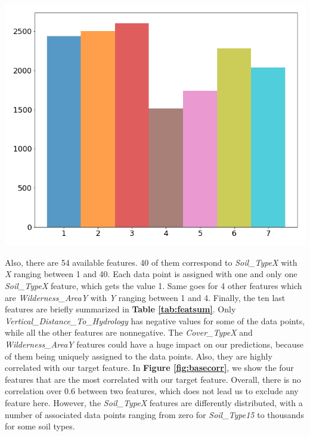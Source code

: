 \documentclass{article}
\newenvironment{Figure}
  {\par\medskip\noindent\minipage{\linewidth}}
  {\endminipage\par\medskip}
\begin{document}
\begin{multicols}{2}
\begin{Figure}
    \centering
    \captionsetup{type=figure}
    \includegraphics[width=0.75\linewidth]{figures/label_repart.png}
    \label{fig:labelrepart}
\end{Figure}

Also, there are 54
available features. 40 of them correspond to \textit{Soil\_TypeX} with \textit{X} ranging
between 1 and 40. Each data point is assigned with one and only one \textit{Soil\_TypeX}
feature, which gets the value 1. Same goes for 4 other features which are
\textit{Wilderness\_AreaY} with \textit{Y} ranging between 1 and 4. Finally, the ten last
features are briefly summarized in \textbf{Table \ref{tab:featsum}}. Only
\textit{Vertical\_Distance\_To\_Hydrology} has negative values for some of the data points,
while all the other features are nonnegative. The \textit{Cover\_TypeX} and
\textit{Wilderness\_AreaY} features could have a huge impact on our predictions, because
of them being uniquely assigned to the data points. Also, they are highly correlated
with our target feature. In \textbf{Figure \ref{fig:basecorr}}, we show the four features
that are the most correlated with our target feature. Overall, there is no correlation
over 0.6 between two features, which does not lead us to exclude any feature here.
However, the \textit{Soil\_TypeX}
features are differently distributed, with a number of associated data points ranging
from zero for \textit{Soil\_Type15} to thousands for some soil types.


\end{multicols}
\end{document}

